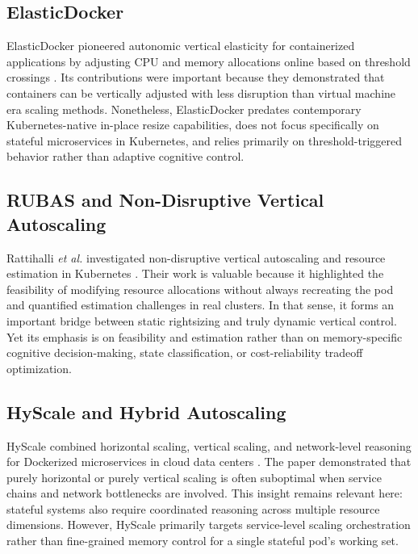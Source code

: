 \documentclass[12pt,a4paper]{article}
\begin{document}
\subsection{ElasticDocker}

ElasticDocker pioneered autonomic vertical elasticity for containerized applications by adjusting CPU and memory allocations online based on threshold crossings \cite{elasticdocker}. Its contributions were important because they demonstrated that containers can be vertically adjusted with less disruption than virtual machine era scaling methods. Nonetheless, ElasticDocker predates contemporary Kubernetes-native in-place resize capabilities, does not focus specifically on stateful microservices in Kubernetes, and relies primarily on threshold-triggered behavior rather than adaptive cognitive control.

\subsection{RUBAS and Non-Disruptive Vertical Autoscaling}

Rattihalli \emph{et al.} investigated non-disruptive vertical autoscaling and resource estimation in Kubernetes \cite{rattihalli2019}. Their work is valuable because it highlighted the feasibility of modifying resource allocations without always recreating the pod and quantified estimation challenges in real clusters. In that sense, it forms an important bridge between static rightsizing and truly dynamic vertical control. Yet its emphasis is on feasibility and estimation rather than on memory-specific cognitive decision-making, state classification, or cost-reliability tradeoff optimization.

\subsection{HyScale and Hybrid Autoscaling}

HyScale combined horizontal scaling, vertical scaling, and network-level reasoning for Dockerized microservices in cloud data centers \cite{hyscale}. The paper demonstrated that purely horizontal or purely vertical scaling is often suboptimal when service chains and network bottlenecks are involved. This insight remains relevant here: stateful systems also require coordinated reasoning across multiple resource dimensions. However, HyScale primarily targets service-level scaling orchestration rather than fine-grained memory control for a single stateful pod's working set.
\end{document}
